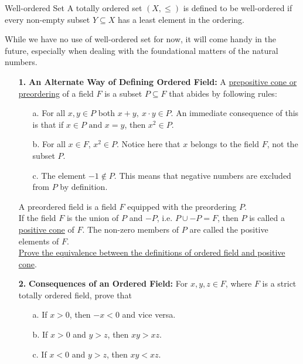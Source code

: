 \begin{Definition}{Well-ordered Set}\label{well-ordered_set}
	A totally ordered set $(X,\leq)$ is defined to be well-ordered if every non-empty subset $Y\subseteq X$ has a least element in the ordering.
\end{Definition}
\noindent While we have no use of well-ordered set for now, it will come handy in the future, especially when dealing with the foundational matters of the natural numbers.
\exercise
\begin{enumerate}[label=\textbf{\arabic*.}]
    \item[\textbf{1.}] \textbf{An Alternate Way of Defining Ordered Field:} A \underline{prepositive cone or preordering} of a field $F$ is a subset $P\subseteq F$ that abides by following rules:
    \begin{enumerate}
        \item[a.] For all $x,y\in P$ both $x+y,\ x\cdot y\in P$. An immediate consequence of this is that if $x\in P\text{ and } x=y$, then $x^2\in P$.
        \item[b.] For all $x\in F$, $x^2\in P$. Notice here that $x$ belongs to the field $F$, not the subset $P$.
        \item[c.] The element $-1\notin P$. This means that negative numbers are excluded from $P$ by definition.
    \end{enumerate}
    A preordered field is a field $F$ equipped with the preordering $P$.\\
    If the field $F$ is the union of $P$ and $-P$, i.e. $P\cup-P=F$, then $P$ is called a \underline{positive cone} of $F$. The non-zero members of $P$ are called the positive elements of $F$.\\
    \underline{Prove the equivalence between the definitions of ordered field and positive cone}\footnotemark.
    \item[\textbf{2.}] \textbf{Consequences of an Ordered Field:} For $x,y,z\in F$, where $F$ is a strict totally ordered field, prove that
    \begin{enumerate}
        \item[a.] If $x>0$, then $-x<0$ and vice versa.
        \item[b.] If $x>0$ and $y>z$, then $xy>xz$.
        \item[c.] If $x<0$ and $y>z$, then $xy<xz$.

\end{enumerate}
\end{enumerate}

